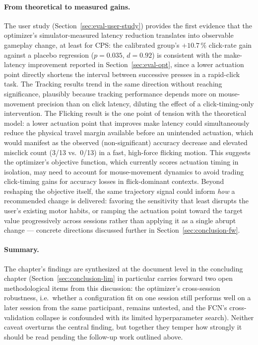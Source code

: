 \paragraph{From theoretical to measured gains.}
The user study (Section~\ref{sec:eval-user-study}) provides the first evidence
that the optimizer's simulator-measured latency reduction translates into
observable gameplay change, at least for CPS: the calibrated group's $+10.7\,\%$
click-rate gain against a placebo regression ($p=0.035$, $d=0.92$) is consistent
with the make-latency improvement reported in Section~\ref{sec:eval-opt}, since a
lower actuation point directly shortens the interval between successive presses
in a rapid-click task.
The Tracking results trend in the same direction without
reaching significance, plausibly because tracking performance depends more on
mouse-movement precision than on click latency, diluting the effect of a
click-timing-only intervention. The Flicking result is the one point of tension
with the theoretical model: a lower actuation point that improves make latency
could simultaneously reduce the physical travel margin available before an
unintended actuation, which would manifest as the observed (non-significant)
accuracy decrease and elevated misclick count (3/13 vs.\ 0/13) in a fast,
high-force flicking motion. This suggests the optimizer's objective function,
which currently scores actuation timing in isolation, may need to account for
mouse-movement dynamics to avoid trading click-timing gains for accuracy losses
in flick-dominant contexts. Beyond reshaping the objective itself, the same
trajectory signal could inform \emph{how} a recommended change is delivered:
favoring the sensitivity that least disrupts the user's existing motor habits,
or ramping the actuation point toward the target value progressively across
sessions rather than applying it as a single abrupt change --- concrete
directions discussed further in Section~\ref{sec:conclusion-fw}.

\paragraph{Summary.}
The chapter's findings are synthesized at the document level in the concluding
chapter (Section~\ref{sec:conclusion-lim} in particular carries forward two open
methodological items from this discussion: the optimizer's cross-session
robustness, i.e.\ whether a configuration fit on one session still performs
well on a later session from the same participant, remains untested, and the
FCN's cross-validation collapse is confounded with its limited hyperparameter
search). Neither caveat overturns the central finding, but together they
temper how strongly it should be read pending the follow-up work outlined
above.

